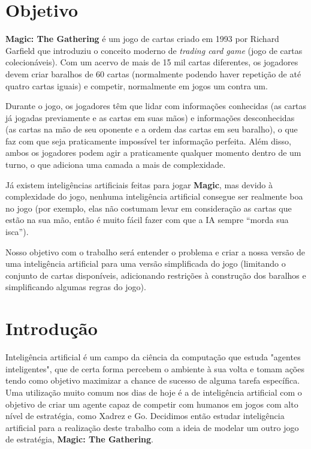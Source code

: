 \documentclass{book}
\begin{document}
\chapter*{Objetivo}
\textbf{Magic: The Gathering} é um jogo de cartas criado em 1993 por
Richard Garfield que introduziu o conceito moderno de \textit{trading
card game} (jogo de cartas colecionáveis). Com um acervo de mais de 15
mil cartas diferentes, os jogadores devem criar baralhos de 60 cartas
(normalmente podendo haver repetição de até quatro cartas iguais) e
competir, normalmente em jogos um contra um.
\par Durante o jogo, os jogadores têm que lidar com informações
conhecidas (as cartas já jogadas previamente e as cartas em suas mãos) e
informações desconhecidas (as cartas na mão de seu oponente e a ordem
das cartas em seu baralho), o que faz com que seja praticamente
impossível ter informação perfeita. Além disso, ambos os jogadores podem
agir a praticamente qualquer momento dentro de um turno, o que adiciona
uma camada a mais de complexidade.
\par Já existem inteligências artificiais feitas para jogar
\textbf{Magic}, mas devido à complexidade do jogo, nenhuma inteligência
artificial consegue ser realmente boa no jogo (por exemplo, elas não
costumam levar em consideração as cartas que estão na sua mão, então é
muito fácil fazer com que a IA sempre ``morda sua isca'').
\par Nosso objetivo com o trabalho será entender o problema e criar a
nossa versão de uma inteligência artificial para uma versão simplificada
do jogo (limitando o conjunto de cartas disponíveis, adicionando
restrições à construção dos baralhos e simplificando algumas regras do
jogo).

\chapter{Introdução}

Inteligência artificial é um campo da ciência da computação que estuda
"agentes inteligentes", que de certa forma percebem o ambiente à sua volta
e tomam ações tendo como objetivo maximizar a chance de sucesso de alguma
tarefa específica. Uma utilização muito comum nos dias de hoje é a de
inteligência artificial com o objetivo de criar um agente capaz de competir
com humanos em jogos com alto nível de estratégia, como Xadrez e Go.
Decidimos então estudar inteligência artificial para a realização deste
trabalho com a ideia de modelar um outro jogo de estratégia,
\textbf{Magic: The Gathering}.
\end{document}

